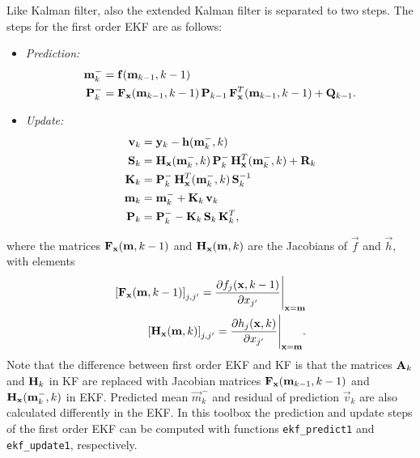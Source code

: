 Like Kalman filter, also the extended Kalman filter is separated to
two steps.  The steps for the first order EKF are as follows:
  \begin{itemize}
  \item {\em Prediction:}
  \begin{equation}
  \begin{split}
    \mathbf{m}^-_{k} &= \mathbf{f}(\mathbf{m}_{k-1},k-1) \\
    \mathbf{P}^-_{k} &= \mathbf{F}_{\mathbf{x}}(\mathbf{m}_{k-1},k-1) \, \mathbf{P}_{k-1} \,
     \mathbf{F}_{\mathbf{x}}^T (\mathbf{m}_{k-1},k-1) + \mathbf{Q}_{k-1}.
  \end{split}
  \label{eq:dekf_predict1}
  \end{equation}
  
  \item {\em Update:}
  \begin{equation}
  \begin{split}
    \mathbf{v}_{k} &= \mathbf{y}_k - \mathbf{h} (\mathbf{m}^-_{k},k) \\
    \mathbf{S}_{k} &= \mathbf{H}_{\mathbf{x}}(\mathbf{m}^-_{k},k) \, \mathbf{P}^-_{k} \,
    \mathbf{H}^T_{\mathbf{x}}(\mathbf{m}^-_{k},k) + \mathbf{R}_{k} \\
    \mathbf{K}_{k} &= \mathbf{P}^-_{k} \, \mathbf{H}^T_{\mathbf{x}}(\mathbf{m}^-_{k},k) \,
    \mathbf{S}^{-1}_{k} \\
    \mathbf{m}_{k} &= \mathbf{m}^-_{k} + \mathbf{K}_{k} \, \mathbf{v}_k \\
    \mathbf{P}_{k} &= \mathbf{P}^-_{k} - \mathbf{K}_{k} \, \mathbf{S}_{k} \, \mathbf{K}^T_{k},
  \end{split}
  \label{eq:dekf_update1}
  \end{equation}
  \end{itemize}
  where the matrices $\mathbf{F}_{\mathbf{x}}(\mathbf{m},k-1)$ and
  $\mathbf{H}_{\mathbf{x}}(\mathbf{m},k)$ are the Jacobians of
  $\vec{f}$ and $\vec{h}$, with elements
  \begin{align}
    \left[ \mathbf{F}_{\mathbf{x}}(\mathbf{m},k-1) \right]_{j,j'} =
    \frac{\partial f_j(\mathbf{x},k-1)}{\partial x_{j'}}
    \Bigg|_{\mathbf{x} = \mathbf{m}}
  \label{eq:F1} \\
    \left[ \mathbf{H}_{\mathbf{x}}(\mathbf{m},k) \right]_{j,j'} =
    \frac{\partial h_j(\mathbf{x},k)}{\partial x_{j'}}
    \Bigg|_{\mathbf{x} = \mathbf{m}}.
  \label{eq:H1}
  \end{align}
%
Note that the difference between first order EKF and KF is that the
matrices $\mathbf{A}_k$ and $\mathbf{H}_k$ in KF are replaced with Jacobian
matrices $\mathbf{F}_{\mathbf{x}}(\mathbf{m}_{k-1},k-1)$ and
$\mathbf{H}_{\mathbf{x}}(\mathbf{m}_k^-,k)$ in EKF. Predicted mean
$\vec{m}_k^-$ and residual of prediction $\vec{v}_k$ are also
calculated differently in the EKF.  In this toolbox the prediction and
update steps of the first order EKF can be computed with functions
\texttt{ekf\_predict1} and \texttt{ekf\_update1}, respectively.


